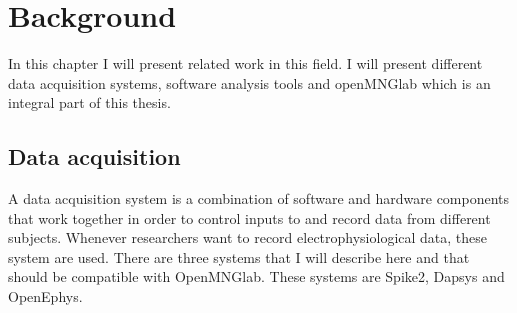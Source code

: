 \chapter{Background}
In this chapter I will present related work in this field. I will present different data acquisition systems, software analysis tools and openMNGlab which is an integral part of this thesis.\\

\section{Data acquisition} 
A data acquisition system is a combination of software and hardware components that work together in order to control inputs to and record data from different subjects. Whenever researchers want to record electrophysiological data, these system are used.
There are three systems that I will describe here and that should be compatible with OpenMNGlab. These systems are Spike2, Dapsys and OpenEphys.

